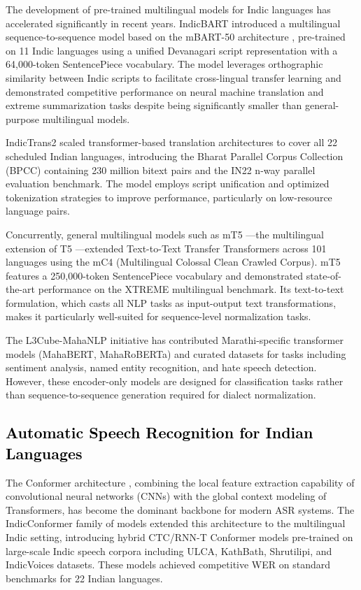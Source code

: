 The development of pre-trained multilingual models for Indic languages has accelerated significantly in recent years. IndicBART \cite{dabre2022indicbart} introduced a multilingual sequence-to-sequence model based on the mBART-50 architecture \cite{lewis2020bart}, pre-trained on 11 Indic languages using a unified Devanagari script representation with a 64,000-token SentencePiece vocabulary. The model leverages orthographic similarity between Indic scripts to facilitate cross-lingual transfer learning and demonstrated competitive performance on neural machine translation and extreme summarization tasks despite being significantly smaller than general-purpose multilingual models.

IndicTrans2 \cite{gala2023indictrans2} scaled transformer-based translation architectures to cover all 22 scheduled Indian languages, introducing the Bharat Parallel Corpus Collection (BPCC) containing 230 million bitext pairs and the IN22 n-way parallel evaluation benchmark. The model employs script unification and optimized tokenization strategies to improve performance, particularly on low-resource language pairs.

Concurrently, general multilingual models such as mT5 \cite{xue2021mt5}---the multilingual extension of T5 \cite{raffel2020exploring}---extended Text-to-Text Transfer Transformers across 101 languages using the mC4 (Multilingual Colossal Clean Crawled Corpus). mT5 features a 250,000-token SentencePiece vocabulary and demonstrated state-of-the-art performance on the XTREME multilingual benchmark. Its text-to-text formulation, which casts all NLP tasks as input-output text transformations, makes it particularly well-suited for sequence-level normalization tasks.

The L3Cube-MahaNLP initiative \cite{joshi2022l3cube} has contributed Marathi-specific transformer models (MahaBERT, MahaRoBERTa) and curated datasets for tasks including sentiment analysis, named entity recognition, and hate speech detection. However, these encoder-only models are designed for classification tasks rather than sequence-to-sequence generation required for dialect normalization.

\subsection{\textcolor{black}{Automatic Speech Recognition for Indian Languages}}

The Conformer architecture \cite{gulati2020conformer}, combining the local feature extraction capability of convolutional neural networks (CNNs) with the global context modeling of Transformers, has become the dominant backbone for modern ASR systems. The IndicConformer family of models \cite{jain2024indicconformer} extended this architecture to the multilingual Indic setting, introducing hybrid CTC/RNN-T Conformer models pre-trained on large-scale Indic speech corpora including ULCA, KathBath, Shrutilipi, and IndicVoices datasets. These models achieved competitive WER on standard benchmarks for 22 Indian languages.

